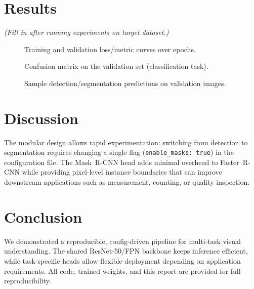 \documentclass[11pt,a4paper]{article}
\begin{document}
\section{Results}
\label{sec:results}

\textit{(Fill in after running experiments on target dataset.)}

\begin{figure}[h]
  \centering
  \caption{Training and validation loss/metric curves over epochs.}
  \label{fig:curves}
\end{figure}

\begin{figure}[h]
  \centering
  \caption{Confusion matrix on the validation set (classification task).}
  \label{fig:cm}
\end{figure}

\begin{figure}[h]
  \centering
  \caption{Sample detection/segmentation predictions on validation images.}
  \label{fig:preds}
\end{figure}

\section{Discussion}
\label{sec:discuss}

The modular design allows rapid experimentation: switching from detection to
segmentation requires changing a single flag (\texttt{enable\_masks:~true})
in the configuration file.  The Mask~R-CNN head adds minimal overhead to
Faster~R-CNN while providing pixel-level instance boundaries that can
improve downstream applications such as measurement, counting, or
quality inspection.

\section{Conclusion}
\label{sec:conclusion}

We demonstrated a reproducible, config-driven pipeline for multi-task visual
understanding.  The shared ResNet-50/FPN backbone keeps inference efficient,
while task-specific heads allow flexible deployment depending on application
requirements.  All code, trained weights, and this report are provided for
full reproducibility.



\end{document}
